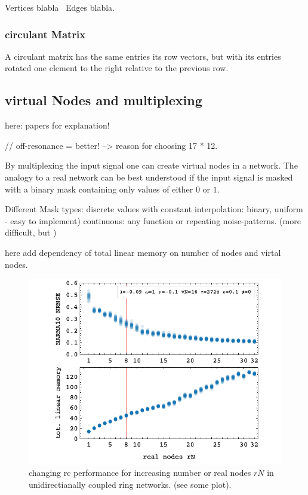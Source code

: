 Vertices blabla \
Edges blabla. \

	\subsubsection{circulant Matrix}
    A circulant matrix has the same entries its row vectors, but with its entries rotated one element to the right relative to the previous row.

    
\subsection{virtual Nodes and multiplexing}
	here: papers for explanation! 
	\cite{KUR18}
	
	\cite{STE20} // off-resonance = better! --> reason for choosing 17 * 12.
	
	By multiplexing the input signal one can create virtual nodes in a network. The analogy to a real network can be best understood if the input signal is masked with a binary mask containing only values of either $0$ or $1$. 
	
	Different Mask types: discrete values with constant interpolation: binary, uniform - easy to implement)
	continuous: any function or repeating noise-patterns. (more difficult, but )

	
	here add dependency of total linear memory on number of nodes and virtal nodes.

	
	\begin{figure}
		\centering
		\includegraphics[width=0.9\linewidth]{pics/rNplot}
		\caption{changing rc performance for increasing number or real nodes $rN$ in unidirectianally coupled ring networks. (see some plot).}
		\label{fig:rN_1-32}
	\end{figure}

